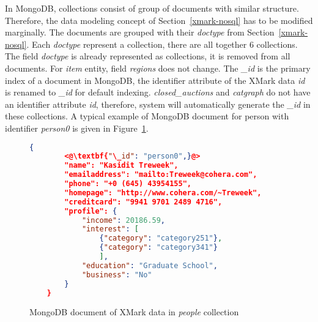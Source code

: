 In MongoDB, collections consist of group of documents with similar structure. Therefore, the data modeling concept of Section~\ref{xmark-nosql} has to be modified marginally. The documents are grouped with their \textit{doctype} from Section~\ref{xmark-nosql}. Each \textit{doctype} represent a collection, there are all together 6 collections. The field \textit{doctype} is already represented as collections, it is removed from all documents.  
For \textit{item} entity,  field \textit{regions} does not change. The \textit{\_id} is the primary index of a document in MongoDB, the identifier attribute of the XMark data \textit{id} is renamed to \textit{\_id} for default indexing.  \textit{closed\_auctions} and \textit{catgraph} do not have an identifier attribute \textit{id}, therefore, system will automatically generate the \textit{\_id} in these collections.
A typical example of MongoDB document for person with identifier \textit{person0} is given in Figure~\ref{code:mongodb-person0}.	

\begin{figure}[hbt]
\begin{lstlisting}[language=JSON, basicstyle =\scriptsize]
    {
    	<@\textbf{"\_id": "person0",}@>
    	"name": "Kasidit Treweek",
    	"emailaddress": "mailto:Treweek@cohera.com",
    	"phone": "+0 (645) 43954155",
    	"homepage": "http://www.cohera.com/~Treweek",
    	"creditcard": "9941 9701 2489 4716",
    	"profile": {
    		"income": 20186.59,
    		"interest": [
    			{"category": "category251"},
    			{"category": "category341"}
    			],
    		"education": "Graduate School",
    		"business": "No"
    	}
    }
\end{lstlisting}
\caption{MongoDB document of XMark data in \textit{people} collection}
\label{code:mongodb-person0}
\end{figure}